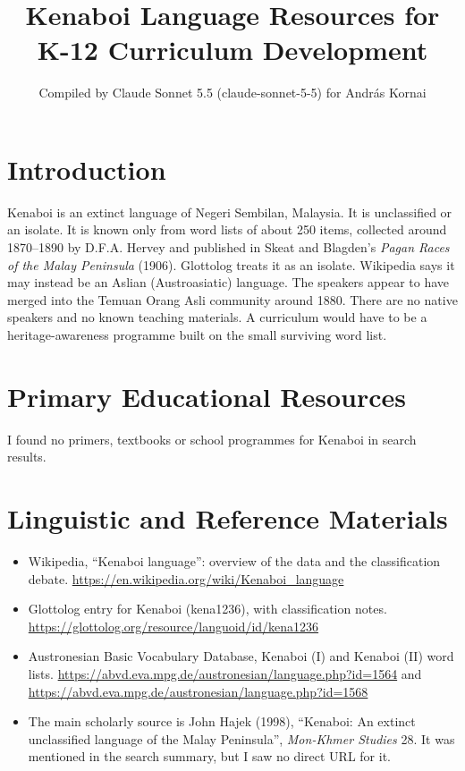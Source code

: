 \documentclass[12pt]{article}
\title{Kenaboi Language Resources for K-12 Curriculum Development}
\author{Compiled by Claude Sonnet 5.5 (claude-sonnet-5-5) for Andr\'as Kornai}
\date{}
\begin{document}
\maketitle

\section{Introduction}
Kenaboi is an extinct language of Negeri Sembilan, Malaysia. It is unclassified or an isolate. It is known only from word lists of about 250 items, collected around 1870--1890 by D.F.A. Hervey and published in Skeat and Blagden's \emph{Pagan Races of the Malay Peninsula} (1906). Glottolog treats it as an isolate. Wikipedia says it may instead be an Aslian (Austroasiatic) language. The speakers appear to have merged into the Temuan Orang Asli community around 1880. There are no native speakers and no known teaching materials. A curriculum would have to be a heritage-awareness programme built on the small surviving word list.

\section{Primary Educational Resources}
I found no primers, textbooks or school programmes for Kenaboi in search results.

\section{Linguistic and Reference Materials}
\begin{itemize}
\item Wikipedia, ``Kenaboi language'': overview of the data and the classification debate. \url{https://en.wikipedia.org/wiki/Kenaboi_language}
\item Glottolog entry for Kenaboi (kena1236), with classification notes. \url{https://glottolog.org/resource/languoid/id/kena1236}
\item Austronesian Basic Vocabulary Database, Kenaboi (I) and Kenaboi (II) word lists. \url{https://abvd.eva.mpg.de/austronesian/language.php?id=1564} and \url{https://abvd.eva.mpg.de/austronesian/language.php?id=1568}
\item The main scholarly source is John Hajek (1998), ``Kenaboi: An extinct unclassified language of the Malay Peninsula'', \emph{Mon-Khmer Studies} 28. It was mentioned in the search summary, but I saw no direct URL for it.
\end{itemize}
\end{document}
